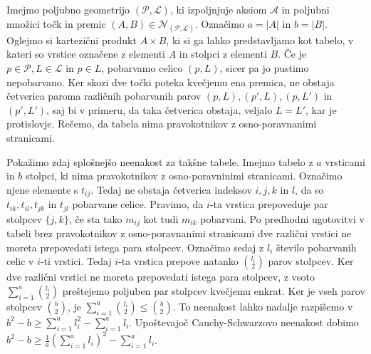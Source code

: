 \documentclass[mat1, tisk]{fmfdelo}
\begin{document}
    \begin{dokaz}
        Imejmo poljubno geometrijo $(\mathcal{P}, \mathcal{L})$, ki izpoljnjuje aksiom $\mathcal{A}$ in poljubni množici točk in premic $(A, B) \in \mathcal{N}_{(\mathcal{P}, \mathcal{L})}$. Označimo $a = |A|$ in $b = |B|$. Oglejmo si kartezični produkt $A \times B$, ki si ga lahko predstavljamo kot tabelo, v kateri so vrstice označene z elementi $A$ in stolpci z
        elementi $B$. Če je $p \in \mathcal{P}, L \in \mathcal{L}$ in $p \in L$, pobarvamo celico $(p, L)$, sicer pa jo pustimo nepobarvano. Ker skozi dve točki poteka kvečjemu ena premica, ne obstaja četverica paroma različnih pobarvanih parov $(p, L), (p', L), (p, L')$ in $(p', L')$, saj bi v primeru, da taka četverica obstaja,
        veljalo $L = L'$, kar je protislovje. Rečemo, da tabela nima pravokotnikov z osno-poravnanimi stranicami.

        Pokažimo zdaj splošnejšo neenakost za takšne tabele. Imejmo tabelo z $a$ vrsticami in $b$ stolpci, ki nima pravokotnikov z osno-poravninimi stranicami. Označimo njene elemente s $t_{ij}$. Tedaj ne obstaja četverica indeksov $i, j, k \text{ in } l$, da so $t_{ik}, t_{il}, t_{jk}$ in $t_{jl}$ pobarvane celice. Pravimo, da $i$-ta
        vrstica prepoveduje par stolpcev $\{j, k\}$, če sta tako $m_{ij}$ kot tudi $m_{ik}$ pobarvani. Po predhodni ugotovitvi v tabeli brez pravokotnikov z osno-poravnanimi stranicami dve različni vrstici ne moreta prepovedati istega para stolpcev. Označimo sedaj z $l_i$ število pobarvanih celic v $i$-ti vrstici. Tedaj $i$-ta vrstica
        prepove natanko $\binom{l_i}{2}$ parov stolpcev. Ker dve različni vrstici ne moreta prepovedati istega para stolpcev, z vsoto $\sum_{i=1}^a\binom{l_i}{2}$ preštejemo poljuben par stolpcev kvečjemu enkrat. Ker je vseh parov stolpcev $\binom{b}{2}$, je $\sum_{i=1}^a\binom{l_i}{2} \leq \binom{b}{2}$. To neenakost lahko nadalje razpišemo
        v $b^2 - b \geq \sum_{i=1}^{a}l_i^2 - \sum_{i=1}^{a}l_i$. Upoštevajoč Cauchy-Schwarzovo neenakost dobimo $b^2 - b \geq \frac{1}{a}(\sum_{i=1}^{a}l_i)^2 - \sum_{i=1}^{a}l_i$.


\end{dokaz}
\end{document}
